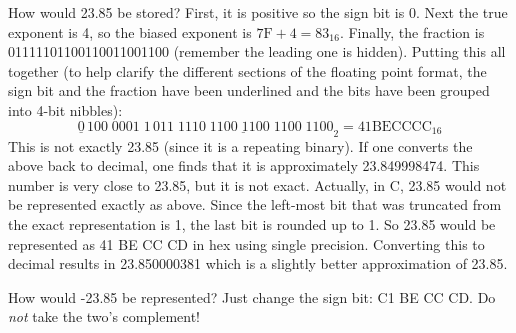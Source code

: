 How would 23.85 be stored?  First, it is positive so the sign bit is
0. Next the true exponent is 4, so the biased exponent is $7\mathrm{F}
+ 4 = 83_{16}$. Finally, the fraction is 01111101100110011001100
(remember the leading one is hidden). Putting this all together
(to help clarify the different sections of the floating point
format, the sign bit and the fraction have been underlined and the
bits have been grouped into 4-bit nibbles):
\[ \underline{0}\,100\;0001\;1
   \,\underline{011\;1110\;1100\;1100\;1100\;1100}_2 = 41 \mathrm{BE} 
\mathrm{CC} \mathrm{CC}_{16} \]
This is not exactly 23.85 (since it is a repeating binary). If one converts
the above back to decimal, one finds that it is approximately 
23.849998474. This number is very close to 23.85, but it is not exact. 
Actually, in C, 23.85 would not be represented exactly as above. Since
the left-most bit that was truncated from the exact representation is 1,
the last bit is rounded up to 1. So 23.85 would be represented as
41 BE CC CD in hex using single precision. Converting this to decimal
results in 23.850000381 which is a slightly better approximation of 23.85.

How would -23.85 be represented? Just change the sign bit: C1 BE CC
CD. Do \emph{not} take the two's complement!

\begin{table}[t]
\caption{Special values of \emph{f} and \emph{e}\label{tab:floatSpecials}}
\end{table}

